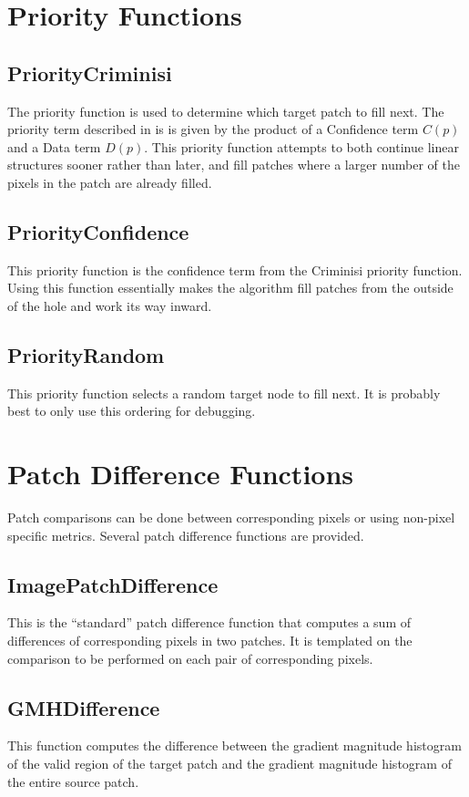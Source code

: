 \documentclass{InsightArticle}
\begin{document}
\section{Priority Functions}
\label{sec:PriorityFunctions}
\subsection{PriorityCriminisi}
The priority function is used to determine which target patch to fill next. The priority term described in \cite{criminis} is is given by the product of a Confidence term $C(p)$ and a Data term $D(p)$. This priority function attempts to both continue linear structures sooner rather than later, and fill patches where a larger number of the pixels in the patch are already filled.

\subsection{PriorityConfidence}
This priority function is the confidence term from the Criminisi priority function. Using this function essentially makes the algorithm fill patches from the outside of the hole and work its way inward.

\subsection{PriorityRandom}
This priority function selects a random target node to fill next. It is probably best to only use this ordering for debugging.

\section{Patch Difference Functions}
\label{sec:PatchMatching}
Patch comparisons can be done between corresponding pixels or using non-pixel specific metrics. Several patch difference functions are provided.

\subsection{ImagePatchDifference}
This is the ``standard'' patch difference function that computes a sum of differences of corresponding pixels in two patches. It is templated on the comparison to be performed on each pair of corresponding pixels.

\subsection{GMHDifference}
This function computes the difference between the gradient magnitude histogram of the valid region of the target patch and the gradient magnitude histogram of the entire source patch. 
\end{document}
